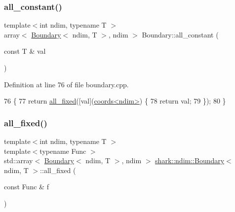 \subsubsection{\texorpdfstring{all\+\_\+constant()}{all\_constant()}}
{\footnotesize\ttfamily template$<$int ndim, typename T $>$ \\
array$<$ \hyperlink{classshark_1_1ndim_1_1_boundary}{Boundary}$<$ ndim, T $>$, ndim $>$ Boundary\+::all\+\_\+constant (\begin{DoxyParamCaption}\item[{const T \&}]{val }\end{DoxyParamCaption})\hspace{0.3cm}{\ttfamily [static]}}



Definition at line 76 of file boundary.\+cpp.


\begin{DoxyCode}
76                                                                         \{
77     \textcolor{keywordflow}{return} \hyperlink{classshark_1_1ndim_1_1_boundary_ac4a1c6582cb46a3f1eb59acf416860a7}{all\_fixed}([val](\hyperlink{structshark_1_1ndim_1_1coords}{coords<ndim>}) \{
78         \textcolor{keywordflow}{return} val;
79     \});
80 \}
\end{DoxyCode}
\hypertarget{classshark_1_1ndim_1_1_boundary_ac4a1c6582cb46a3f1eb59acf416860a7}{}\label{classshark_1_1ndim_1_1_boundary_ac4a1c6582cb46a3f1eb59acf416860a7} 
\subsubsection{\texorpdfstring{all\+\_\+fixed()}{all\_fixed()}}
{\footnotesize\ttfamily template$<$int ndim, typename T $>$ \\
template$<$typename Func $>$ \\
std\+::array$<$ \hyperlink{classshark_1_1ndim_1_1_boundary}{Boundary}$<$ ndim, T $>$, ndim $>$ \hyperlink{classshark_1_1ndim_1_1_boundary}{shark\+::ndim\+::\+Boundary}$<$ ndim, T $>$\+::all\+\_\+fixed (\begin{DoxyParamCaption}\item[{const Func \&}]{f }\end{DoxyParamCaption})\hspace{0.3cm}{\ttfamily [static]}}



